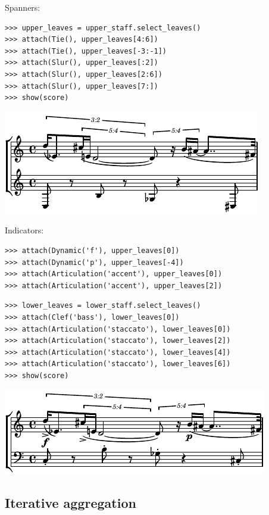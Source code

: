 Spanners:

\begin{lstlisting}
>>> upper_leaves = upper_staff.select_leaves()
>>> attach(Tie(), upper_leaves[4:6])
>>> attach(Tie(), upper_leaves[-3:-1])
>>> attach(Slur(), upper_leaves[:2])
>>> attach(Slur(), upper_leaves[2:6])
>>> attach(Slur(), upper_leaves[7:])
>>> show(score)
\end{lstlisting}

\includegraphics[scale=1.0]{images/notational_isomorphism-2.pdf}


Indicators:

\begin{lstlisting}
>>> attach(Dynamic('f'), upper_leaves[0])
>>> attach(Dynamic('p'), upper_leaves[-4])
>>> attach(Articulation('accent'), upper_leaves[0])
>>> attach(Articulation('accent'), upper_leaves[2])
\end{lstlisting}


\begin{lstlisting}
>>> lower_leaves = lower_staff.select_leaves()
>>> attach(Clef('bass'), lower_leaves[0])
>>> attach(Articulation('staccato'), lower_leaves[0])
>>> attach(Articulation('staccato'), lower_leaves[2])
>>> attach(Articulation('staccato'), lower_leaves[4])
>>> attach(Articulation('staccato'), lower_leaves[6])
>>> show(score)
\end{lstlisting}

\includegraphics[scale=1.0]{images/notational_isomorphism-3.pdf}


\subsection{Iterative aggregation}

